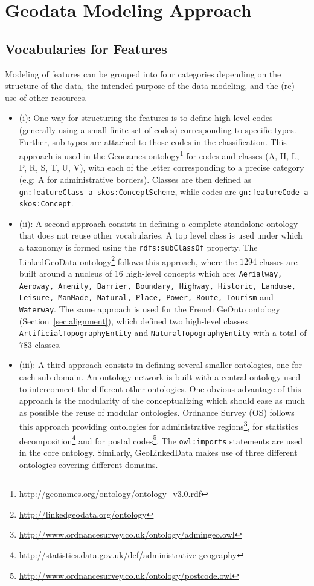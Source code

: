 \documentclass[a4paper,11pt]{report}
\begin{document}
\section{Geodata Modeling Approach}                                         \label{sec:modeling-approach}

\subsection{Vocabularies for Features}
Modeling of features can be grouped into four categories depending on the structure of the data, the intended purpose of the data modeling, and the (re)-use of other resources.
\begin{itemize}
  \item (i): One way for structuring the features is to define high level codes (generally using a small finite set of codes) corresponding to specific
      types. Further, sub-types are attached to those codes in the classification. This approach is used in the Geonames ontology\footnote{\url{http://geonames.org/ontology/ontology_v3.0.rdf}} for codes and classes (A, H, L, P, R, S, T, U, V), with each of the letter corresponding to a precise category (e.g: A for administrative borders). Classes are then defined as \texttt{gn:featureClass a skos:ConceptScheme}, while codes are \texttt{gn:featureCode a skos:Concept}.
  \item (ii): A second approach consists in defining a complete standalone ontology that does not reuse other vocabularies. A top level class is used under which a taxonomy is formed using the \texttt{rdfs:subClassOf} property. The LinkedGeoData ontology\footnote{\url{http://linkedgeodata.org/ontology}} follows this approach, where the $1294$ classes are built around a nucleus of $16$ high-level concepts which are: \texttt{Aerialway, Aeroway, Amenity, Barrier, Boundary, Highway, Historic, Landuse, Leisure, ManMade, Natural, Place, Power, Route, Tourism} and \texttt{Waterway}. The same approach is used for the French GeOnto ontology (Section~\ref{sec:alignment}), which defined two high-level classes \texttt{ArtificialTopographyEntity} and \texttt{Natural\-TopographyEntity} with a total of $783$ classes.
  \item (iii): A third approach consists in defining several smaller ontologies, one for each sub-domain. An ontology network is built with a central ontology used to interconnect the different other ontologies. One obvious advantage of this approach is the modularity of the conceptualizing which should ease as much as possible the reuse of modular ontologies. Ordnance Survey (OS) follows this approach providing ontologies for administrative regions\footnote{\url{http://www.ordnancesurvey.co.uk/ontology/admingeo.owl}}, for statistics decomposition\footnote{\url{http://statistics.data.gov.uk/def/administrative-geography}} and for postal codes\footnote{\url{http://www.ordnancesurvey.co.uk/ontology/postcode.owl}}. The \texttt{owl:imports} statements are used in the core ontology. Similarly, GeoLinkedData makes use of three different ontologies covering different domains.

\end{itemize}
\end{document}
